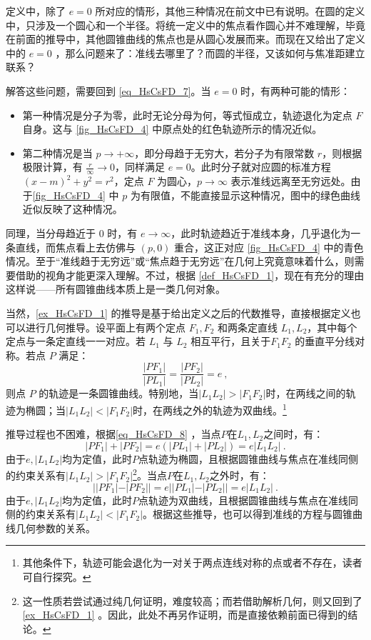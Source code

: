 定义中，除了 $e = 0$ 所对应的情形，其他三种情况在前文中已有说明。在圆的定义中，只涉及一个圆心和一个半径。将统一定义中的焦点看作圆心并不难理解，毕竟在前面的推导中，其他圆锥曲线的焦点也是从圆心发展而来。而现在又给出了定义中的 $e = 0$ ，那么问题来了：准线去哪里了？而圆的半径，又该如何与焦准距建立联系？

解答这些问题，需要回到 \autoref{eq_HsCsFD_7}。当 $e = 0$ 时，有两种可能的情形：
\begin{itemize}
\item 第一种情况是分子为零，此时无论分母为何，等式恒成立，轨迹退化为定点 $F$ 自身。这与 \autoref{fig_HsCsFD_4} 中原点处的红色轨迹所示的情况近似。
\item 第二种情况是当 $p \to +\infty$，即分母趋于无穷大，若分子为有限常数 $r$，则根据极限计算，有 $\displaystyle\frac{r}{\infty} \to 0$，同样满足 $e = 0$。此时分子就对应圆的标准方程 $(x - m)^2 + y^2 = r^2$，定点 $F$ 为圆心，$p \to \infty$ 表示准线远离至无穷远处。由于\autoref{fig_HsCsFD_4} 中 $p$ 为有限值，不能直接显示这种情况，图中的绿色曲线近似反映了这种情况。
\end{itemize}

同理，当分母趋近于 $0$ 时，有 $e \to \infty$，此时轨迹趋近于准线本身，几乎退化为一条直线，而焦点看上去仿佛与 $(p, 0)$ 重合，这正对应 \autoref{fig_HsCsFD_4} 中的青色情况。至于“准线趋于无穷远”或“焦点趋于无穷远”在几何上究竟意味着什么，则需要借助的视角才能更深入理解。不过，根据 \autoref{def_HsCsFD_1}，现在有充分的理由这样说——所有圆锥曲线本质上是一类几何对象。

当然，\autoref{ex_HsCsFD_1} 的推导是基于给出定义之后的代数推导，直接根据定义也可以进行几何推导。设平面上有两个定点 $F_1, F_2$ 和两条定直线 $L_1, L_2$，其中每个定点与一条定直线一一对应。若 $L_1$ 与 $L_2$ 相互平行，且关于$F_1F_2$ 的垂直平分线对称。若点 $P$ 满足：
\begin{equation}\label{eq_HsCsFD_8}
\frac{|PF_1|}{|PL_1|} = \frac{|PF_2|}{|PL_2|} = e~,
\end{equation}
则点 $P$ 的轨迹是一条圆锥曲线。特别地，当$|L_1L_2|>|F_1F_2|$时，在两线之间的轨迹为椭圆；当$|L_1L_2|<|F_1F_2|$时，在两线之外的轨迹为双曲线。\footnote{其他条件下，轨迹可能会退化为一对关于两点连线对称的点或者不存在，读者可自行探究。}

推导过程也不困难，根据\autoref{eq_HsCsFD_8} ，当点$P$在$L_1,L_2$之间时，有：
\begin{equation}
|PF_1|+|PF_2|=e(|PL_1|+|PL_2|)=e|L_1L_2|~.
\end{equation}
由于$e,|L_1L_2|$均为定值，此时$P$点轨迹为椭圆，且根据圆锥曲线与焦点在准线同侧的约束关系有$|L_1L_2|>|F_1F_2|$\footnote{这一性质若尝试通过纯几何证明，难度较高；而若借助解析几何，则又回到了\autoref{ex_HsCsFD_1} 。因此，此处不再另作证明，而是直接依赖前面已得到的结论。}。当点$P$在$L_1,L_2$之外时，有：
\begin{equation}
||PF_1|-|PF_2||=e||PL_1|-|PL_2||=e|L_1L_2|~.
\end{equation}
由于$e,|L_1L_2|$均为定值，此时$P$点轨迹为双曲线，且根据圆锥曲线与焦点在准线同侧的约束关系有$|L_1L_2|<|F_1F_2|$。根据这些推导，也可以得到准线的方程与圆锥曲线几何参数的关系。


